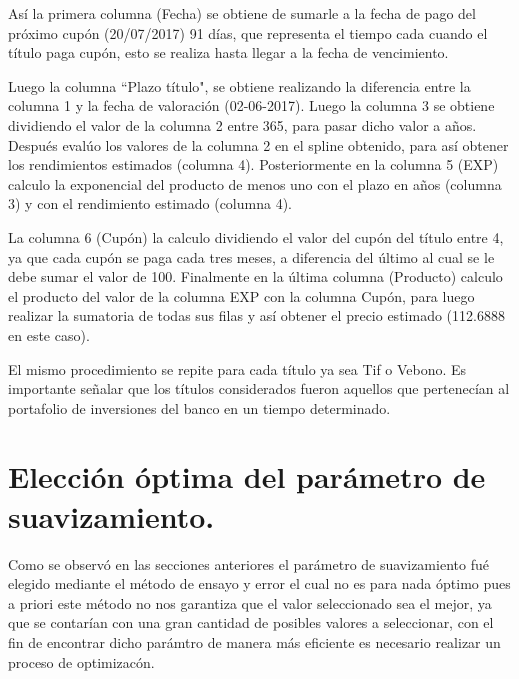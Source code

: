 \vspace{0.5cm}

\hspace{0.4cm}As\'i la primera columna (Fecha) se obtiene de sumarle a la fecha de pago del pr\'oximo cup\'on (20/07/2017) 91 d\'ias, que representa el tiempo cada cuando el t\'itulo paga cup\'on, esto se realiza  hasta llegar a la fecha de vencimiento.

\hspace{0.4cm} Luego la columna ``Plazo t\'itulo", se obtiene realizando la diferencia entre la columna 1 y la fecha de valoraci\'on (02-06-2017). Luego la columna 3 se obtiene dividiendo el valor de la columna 2 entre 365, para pasar dicho valor a a\~nos. Despu\'es eval\'uo los valores de la columna 2 en el spline obtenido, para as\'i obtener los rendimientos estimados (columna 4). Posteriormente en la columna 5 (EXP) calculo la exponencial del producto de menos uno con el plazo en a\~nos (columna 3) y con el rendimiento estimado (columna 4).

\vspace{0.5cm}

\hspace{0.4cm} La columna 6 (Cup\'on) la calculo dividiendo el valor del cup\'on del t\'itulo entre 4, ya que cada cup\'on se paga cada tres meses, a diferencia del \'ultimo al cual se le debe sumar el valor de 100. Finalmente en la \'ultima columna (Producto) calculo el producto del valor de la columna EXP con la columna Cup\'on, para luego realizar la sumatoria de todas sus filas y as\'i obtener el precio estimado (112.6888 en este caso).

\vspace{0.5cm}

\hspace{0.4cm}El mismo procedimiento se repite para cada t\'itulo ya sea Tif o Vebono. Es importante se\~nalar que los t\'itulos considerados fueron aquellos que pertenec\'ian al portafolio de inversiones del banco en un tiempo determinado.

\section{Elecci\'on \'optima del par\'ametro de suavizamiento.}

\hspace{0.4cm} Como se observ\'o en las secciones anteriores el par\'ametro de suavizamiento fu\'e elegido mediante el m\'etodo de ensayo y error el cual no es para nada \'optimo pues a priori este m\'etodo no nos garantiza que el valor seleccionado sea el mejor, ya que se contar\'ian con una gran cantidad de posibles valores a seleccionar, con el fin  de encontrar dicho par\'amtro de manera m\'as eficiente es necesario realizar un proceso de optimizac\'on.

